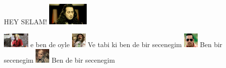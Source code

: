 \documentclass{exam}
\begin{document}
\begin{questions}
\question HEY SELAM!\newline
\includegraphics[height=3em]{komutanlogar.jpeg} \newline
\begin{oneparchoices}
\choice \includegraphics[height=2em]{ersan.jpg}
e ben de oyle
\choice \includegraphics[height=2em]{faruk.jpg}
Ve tabi ki ben de bir secenegim
\choice \includegraphics[height=2em]{arifisik.jpg}
Ben bir secenegim
\choice \includegraphics[height=2em]{216.jpg}
Ben de bir secenegim
\end{oneparchoices}
\end{questions}
\end{document}
